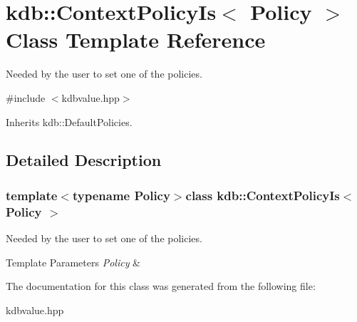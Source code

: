 \hypertarget{classkdb_1_1ContextPolicyIs}{\section{kdb\+:\+:Context\+Policy\+Is$<$ Policy $>$ Class Template Reference}
\label{classkdb_1_1ContextPolicyIs}
}


Needed by the user to set one of the policies.  




{\ttfamily \#include $<$kdbvalue.\+hpp$>$}



Inherits kdb\+::\+Default\+Policies.



\subsection{Detailed Description}
\subsubsection*{template$<$typename Policy$>$class kdb\+::\+Context\+Policy\+Is$<$ Policy $>$}

Needed by the user to set one of the policies. 


\begin{DoxyTemplParams}{Template Parameters}
{\em Policy} & \\
\hline
\end{DoxyTemplParams}


The documentation for this class was generated from the following file\+:\begin{DoxyCompactItemize}
\item 
kdbvalue.\+hpp\end{DoxyCompactItemize}
